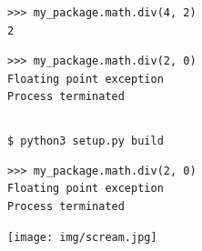 \documentclass[pdf]{beamer}
\begin{document}
\begin{frame}[fragile]
    \begin{verbatim}
>>> my_package.math.div(4, 2)
2
    \end{verbatim}
\end{frame}

\begin{frame}[fragile]
    \begin{verbatim}
>>> my_package.math.div(2, 0)
Floating point exception
Process terminated
    \end{verbatim}
\end{frame}

\begin{frame}
    \inputminted{c++}{my-package/template-div2.cpp}
\end{frame}

\begin{frame}[fragile]
    \verb|$ python3 setup.py build|
\end{frame}

\begin{frame}[fragile]
    \begin{verbatim}
>>> my_package.math.div(2, 0)
Floating point exception
Process terminated
    \end{verbatim}
\end{frame}

\begin{frame}
    \begin{center}
        \texttt{[image: img/scream.jpg]}
    \end{center}
\end{frame}
\end{document}
